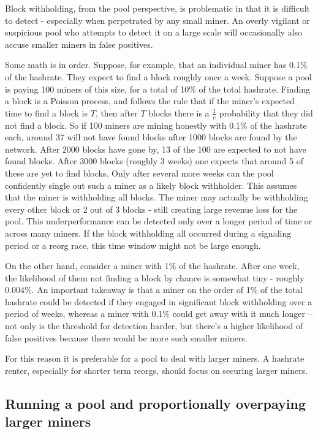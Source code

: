 \documentclass{article}%
\begin{document}
Block withholding, from the pool perspective, is problematic in that it is
difficult to detect - especially when perpetrated by any small miner.  An
overly vigilant or suspicious pool who attempts to detect it on a large scale will
occasionally also accuse smaller miners in false positives.

Some math is in order. Suppose, for example, that an individual miner has
0.1\% of the hashrate.  They expect to find a block roughly once a week.
 Suppose a pool is paying 100 miners of this size, for a total of 10\% of the total hashrate.
 Finding a block is a Poisson process, and follows the rule that if the
miner's expected time to find a block is $T$, then after $T$ blocks there is a
$\frac{1}{e}$ probability that they did not find a block.  So if 100 miners
are mining honestly with 0.1\% of the hashrate each, around 37 will not have found
blocks after 1000 blocks are found by the network.  After 2000 blocks have
gone by, 13 of the 100 are expected to not have found blocks.  After 3000
blocks (roughly 3 weeks) one expects that around 5 of these are yet to find
blocks.  Only after several more weeks can the pool confidently single out
such a miner as a likely block withholder.  This assumes that the miner is
withholding all blocks.  The miner may actually be withholding every other
block or 2 out of 3 blocks - still creating large revenue loss for the pool. This
underperformance can be detected only over a longer period of time or across many miners. If the
block withholding all occurred during a signaling period or a reorg race, this
time window might not be large enough.

On the other hand, consider a miner with 1\% of the hashrate. After one week, the likelihood of
them not finding a block by chance is somewhat tiny - roughly $0.004\%$.  An
important takeaway is that a miner on the order of 1\% of the total hashrate
could be detected if they engaged in significant block withholding over a
period of weeks, whereas a miner with 0.1\% could get away with it much longer
-- not only is the threshold for detection harder, but there's a higher
likelihood of false positives because there would be more such smaller miners.

For this reason it is preferable for a pool to deal with larger miners.
 A hashrate renter, especially for shorter term reorgs, should focus on
securing larger miners.

\subsection{Running a pool and proportionally overpaying larger miners}
\end{document}
